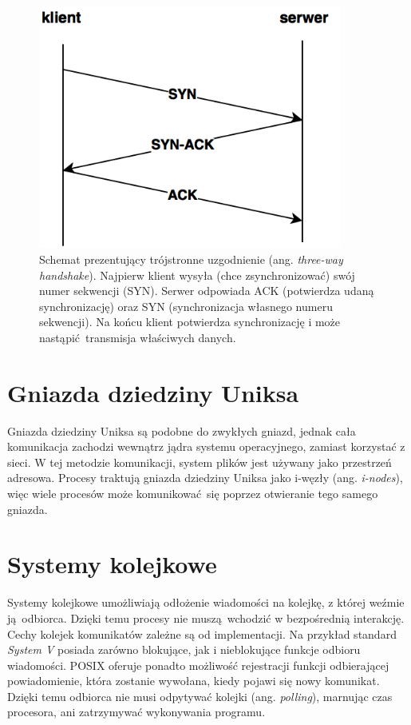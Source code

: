 \begin{figure}[h]
    \centering
    \includegraphics[height=8cm,keepaspectratio]{img/TCP_handshake.png}
    \caption{Schemat prezentujący trójstronne uzgodnienie (ang. \textit{three-way handshake}). Najpierw klient wysyła (chce zsynchronizować) swój numer sekwencji (SYN). Serwer odpowiada ACK (potwierdza udaną synchronizację) oraz SYN (synchronizacja własnego numeru sekwencji). Na końcu klient potwierdza synchronizację i może nastąpić transmisja właściwych danych.}
    \label{fig:TCP_handshake}
\end{figure}


\section{Gniazda dziedziny Uniksa}

Gniazda dziedziny Uniksa są podobne do zwykłych gniazd, jednak cała komunikacja zachodzi wewnątrz jądra systemu operacyjnego, zamiast korzystać z sieci. W tej metodzie komunikacji, system plików jest używany jako przestrzeń adresowa. Procesy traktują gniazda dziedziny Uniksa jako i-węzły (ang. \textit{i-nodes}), więc wiele procesów może komunikować się poprzez otwieranie tego samego gniazda.


\section{Systemy kolejkowe}

Systemy kolejkowe umożliwiają odłożenie wiadomości na kolejkę, z której weźmie ją odbiorca. Dzięki temu procesy nie muszą wchodzić w bezpośrednią interakcję. Cechy kolejek komunikatów zależne są od implementacji. Na przykład standard \textit{System V} posiada zarówno blokujące, jak i nieblokujące funkcje odbioru wiadomości. POSIX oferuje ponadto możliwość rejestracji funkcji odbierającej powiadomienie, która zostanie wywołana, kiedy pojawi się nowy komunikat. Dzięki temu odbiorca nie musi odpytywać kolejki (ang. \textit{polling}), marnując czas procesora, ani zatrzymywać wykonywania programu.


